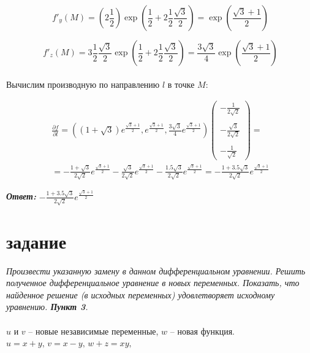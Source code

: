 \documentclass[a5paper, 10pt]{article}
\theoremstyle{definition}
\theoremstyle{plain}
\theoremstyle{remark}
\begin{document}
\begin{equation}
f'_y  \left( M \right) =  \left( 2\frac{1}{2}  \right) \exp \left(\frac{1}{2} + 2\frac{1}{2}\frac{\sqrt{3}}{2} \right) =
\exp \left(\frac{\sqrt{3} + 1}{2} \right)
\end{equation}

\begin{equation}
f'_z  \left( M \right) = 3\frac{1}{2}\frac{\sqrt{3}}{2} \exp \left(\frac{1}{2} + 2\frac{1}{2}\frac{\sqrt{3}}{2} \right) =
\frac{3 \sqrt{3}}{4} \exp \left(\frac{\sqrt{3} + 1}{2} \right)
\end{equation}
\\
Вычислим производную по направлению $l$ в точке $M$:

\begin{multline}
\frac{\partial f}{\partial l} = \left(\left(1 + \sqrt{3} \right) e^{ \frac{\sqrt{3} + 1}{2}} , e^{ \frac{\sqrt{3} + 1}{2}}, \frac{3 \sqrt{3}}{4} e^{ \frac{\sqrt{3} + 1}{2}  } \right)
\begin{pmatrix}
 -\frac{1}{2\sqrt{2}}\\
\\
- \frac{\sqrt{3}}{2\sqrt{2}}\\
\\
- \frac{1}{\sqrt{2}}
\end{pmatrix}
= \\
=   -\frac{1 + \sqrt{3}}{2\sqrt{2}} e^{ \frac{\sqrt{3} + 1}{2}} - \frac{\sqrt{3}}{2\sqrt{2}}  e^{ \frac{\sqrt{3} + 1}{2}}
 - \frac{1.5 \sqrt{3}}{2\sqrt{2}}  e^{ \frac{\sqrt{3} + 1}{2}}  =  - \frac{1 + 3.5 \sqrt{3}}{2\sqrt{2}}  e^{ \frac{\sqrt{3} + 1}{2}} 
\end{multline}

\textit{\textbf{Ответ:}} $ - \frac{1 + 3.5 \sqrt{3}}{2\sqrt{2}}  e^{ \frac{\sqrt{3} + 1}{2}} $





\newpage

\section{задание}
\textit{Произвести указанную замену в данном дифференциальном уравнении. Решить полученное дифференциальное уравнение в новых переменных. Показать, что найденное решение (в исходных переменных) удовлетворяет исходному уравнению. \textbf{Пункт 3}.}\\
\\
$u$ и $v$ -- новые независимые переменные, $w$ -- новая функция. $u=x+y, \, v = x - y, \, w+z = xy,$
\end{document}
